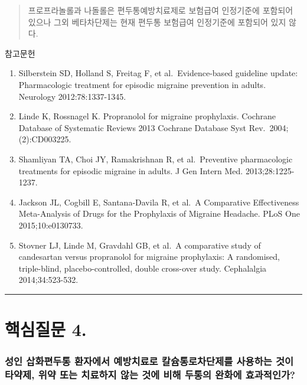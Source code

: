 \documentclass[]{book}
\begin{document}
\begin{quote}
프로프라놀롤과 나돌롤은 편두통예방치료제로 보험급여 인정기준에 포함되어 있으나 그외 베타차단제는 현재 편두통 보험급여 인정기준에 포함되어 있지 않다.
\end{quote}

참고문헌

\begin{enumerate}
\def\labelenumi{\arabic{enumi}.}
\item
  Silberstein SD, Holland S, Freitag F, et al.~Evidence-based guideline update: Pharmacologic treatment for episodic migraine prevention in adults. Neurology 2012:78:1337-1345.
\item
  Linde K, Rossnagel K. Propranolol for migraine prophylaxis. Cochrane Database of Systematic Reviews 2013 Cochrane Database Syst Rev.~2004;(2):CD003225.
\item
  Shamliyan TA, Choi JY, Ramakrishnan R, et al.~Preventive pharmacologic treatments for episodic migraine in adults. J Gen Intern Med. 2013;28:1225-1237.
\item
  Jackson JL, Cogbill E, Santana-Davila R, et al.~A Comparative Effectiveness Meta-Analysis of Drugs for the Prophylaxis of Migraine Headache. PLoS One 2015;10:e0130733.
\item
  Stovner LJ, Linde M, Gravdahl GB, et al.~A comparative study of candesartan versus propranolol for migraine prophylaxis: A randomised, triple-blind, placebo-controlled, double cross-over study. Cephalalgia 2014;34:523-532.
\end{enumerate}

\begin{center}\rule{0.5\linewidth}{\linethickness}\end{center}

\hypertarget{section-13}{%
\section{핵심질문 4.}\label{section-13}}

\hypertarget{section-14}{%
\subsubsection*{성인 삽화편두통 환자에서 예방치료로 칼슘통로차단제를 사용하는 것이 타약제, 위약 또는 치료하지 않는 것에 비해 두통의 완화에 효과적인가?}\label{section-14}}
\end{document}
